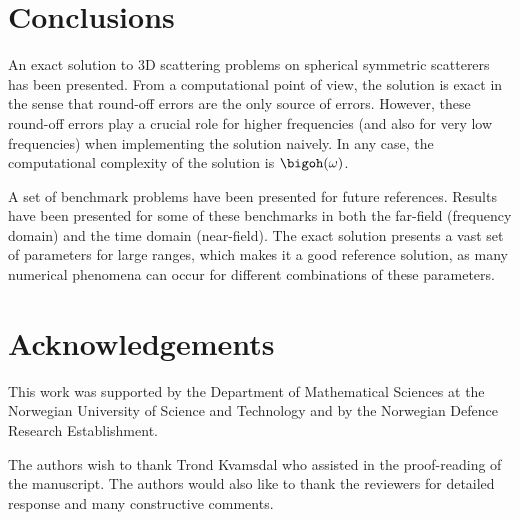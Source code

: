 \newpage
\section{Conclusions}
\label{Sec1:conclusions}
An exact solution to 3D scattering problems on spherical symmetric scatterers has been presented. From a computational point of view, the solution is exact in the sense that round-off errors are the only source of errors. However, these round-off errors play a crucial role for higher frequencies (and also for very low frequencies) when implementing the solution naively. In any case, the computational complexity of the solution is $\bigoh(\omega)$.

A set of benchmark problems have been presented for future references. Results have been presented for some of these benchmarks in both the far-field (frequency domain) and the time domain (near-field). The exact solution presents a vast set of parameters for large ranges, which makes it a good reference solution, as many numerical phenomena can occur for different combinations of these parameters.

%

\section*{Acknowledgements}
This work was supported by the Department of Mathematical Sciences at the Norwegian University of Science and Technology and by the Norwegian Defence Research Establishment. 

The authors wish to thank Trond Kvamsdal who assisted in the proof-reading of the manuscript. The authors would also like to thank the reviewers for detailed response and many constructive comments.